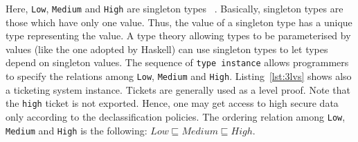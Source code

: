 Here, \texttt{Low}, \texttt{Medium} and \texttt{High} are singleton types \cite{stone2000singleton}~\cite{pierce2005advanced}. Basically, singleton types are those which have only one value. Thus, the value of a singleton type has a unique type representing the value. A type theory allowing types to be parameterised by values (like the one adopted by Haskell) can use singleton types to let types depend on singleton values. The sequence of \texttt{type instance} allows programmers to specify the relations among \texttt{Low}, \texttt{Medium} and \texttt{High}. Listing~\ref{lst:3lvs} shows also a ticketing system instance. Tickets are generally used as a level proof. Note that the \texttt{high} ticket is not exported. Hence, one may get access to high secure data only according to the declassification policies. The ordering relation among \texttt{Low}, \texttt{Medium} and \texttt{High} is the following: $Low \sqsubseteq Medium \sqsubseteq High$.

